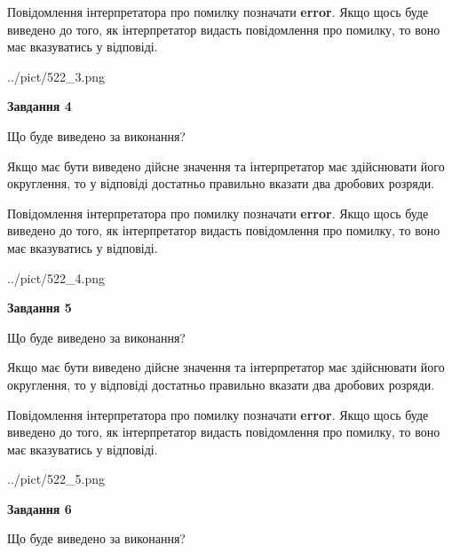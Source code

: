 \documentclass[12pt, ukrainian]{article}
\begin{document}
{\begin {Large}
Повідомлення інтерпретатора про помилку позначати \textbf{error}.
Якщо щось буде виведено до того, як інтерпретатор видасть повідомлення про помилку, 
то воно має вказуватись у відповіді. \par

\begin{center}
	{../pict/522_3.png}
\end{center}
\newpage

{\begin {center}\textbf{Завдання 4}\end {center}}\par
Що буде виведено за виконання? \par

Якщо має бути виведено дійсне значення та інтерпретатор має здійснювати його округлення, 
то у відповіді достатньо правильно вказати два дробових розряди.

Повідомлення інтерпретатора про помилку позначати \textbf{error}.
Якщо щось буде виведено до того, як інтерпретатор видасть повідомлення про помилку, 
то воно має вказуватись у відповіді. \par

\begin{center}
	{../pict/522_4.png}
\end{center}
\newpage

{\begin {center}\textbf{Завдання 5}\end {center}}\par
Що буде виведено за виконання? \par

Якщо має бути виведено дійсне значення та інтерпретатор має здійснювати його округлення, 
то у відповіді достатньо правильно вказати два дробових розряди.

Повідомлення інтерпретатора про помилку позначати \textbf{error}.
Якщо щось буде виведено до того, як інтерпретатор видасть повідомлення про помилку, 
то воно має вказуватись у відповіді. \par

\begin{center}
	{../pict/522_5.png}
\end{center}
\newpage

{\begin {center}\textbf{Завдання 6}\end {center}}\par
Що буде виведено за виконання? \par


\end{Large}}
\end{document}
